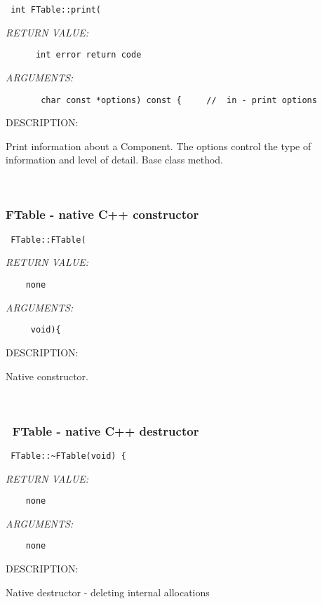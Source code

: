   
\begin{verbatim} int FTable::print(\end{verbatim}{\em RETURN VALUE:}
\begin{verbatim}      int error return code\end{verbatim}{\em ARGUMENTS:}
\begin{verbatim}       char const *options) const {     //  in - print options\end{verbatim}
{\sf DESCRIPTION:\\ }


        Print information about a Component.  The options control the
        type of information and level of detail.  Base class method.
   
 
\mbox{}\hrulefill\
 
\subsubsection [FTable] {FTable - native C++ constructor}


  
\begin{verbatim} FTable::FTable(\end{verbatim}{\em RETURN VALUE:}
\begin{verbatim}    none\end{verbatim}{\em ARGUMENTS:}
\begin{verbatim}     void){\end{verbatim}
{\sf DESCRIPTION:\\ }


    Native constructor.
   
 
\mbox{}\hrulefill\
 
\subsubsection [~FTable] {~FTable - native C++ destructor}


  
\begin{verbatim} FTable::~FTable(void) {\end{verbatim}{\em RETURN VALUE:}
\begin{verbatim}    none\end{verbatim}{\em ARGUMENTS:}
\begin{verbatim}    none\end{verbatim}
{\sf DESCRIPTION:\\ }


    Native destructor - deleting internal allocations
  
\setlength{\parskip}{\oldparskip}
\setlength{\parindent}{\oldparindent}
\setlength{\baselineskip}{\oldbaselineskip}
